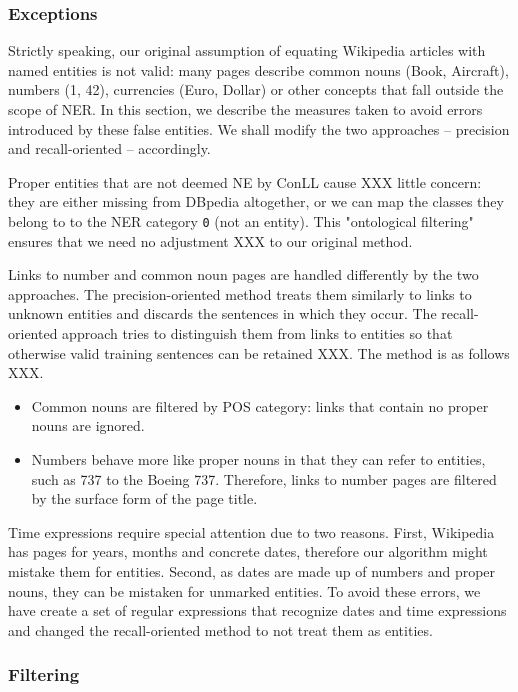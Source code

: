\documentclass[11pt]{article}
\begin{document}
\subsubsection{Exceptions}

Strictly speaking, our original assumption of equating Wikipedia articles with named entities is not valid: many pages describe common nouns (Book, Aircraft), numbers (1, 42), currencies (Euro, Dollar) or other concepts that fall outside the scope of NER. In this section, we describe the measures taken to avoid errors introduced by these false entities. We shall modify the two approaches -- precision and recall-oriented -- accordingly.

Proper entities that are not deemed NE by ConLL cause XXX little concern: they are either missing from DBpedia altogether, or we can map the classes they belong to to the NER category \texttt{0} (not an entity). This "ontological filtering" ensures that we need no adjustment XXX to our original method.

Links to number and common noun pages are handled differently by the two approaches. The precision-oriented method treats them similarly to links to unknown entities and discards the sentences in which they occur. The recall-oriented approach tries to distinguish them from links to entities so that otherwise valid training sentences can be retained XXX. The method is as follows XXX.
\begin{itemize}
\item Common nouns are filtered by POS category: links that contain no proper nouns are ignored.
\item Numbers behave more like proper nouns in that they can refer to entities, such as 737 to the Boeing 737. Therefore, links to number pages are filtered by the surface form of the page title.
\end{itemize}

Time expressions require special attention due to two reasons. First, Wikipedia has pages for years, months and concrete dates, therefore our algorithm might mistake them for entities. Second, as dates are made up of numbers and proper nouns, they can be mistaken for unmarked entities. To avoid these errors, we have create a set of regular expressions that recognize dates and time expressions and changed the recall-oriented method to not treat them as entities.


\subsubsection{Filtering}
\end{document}
